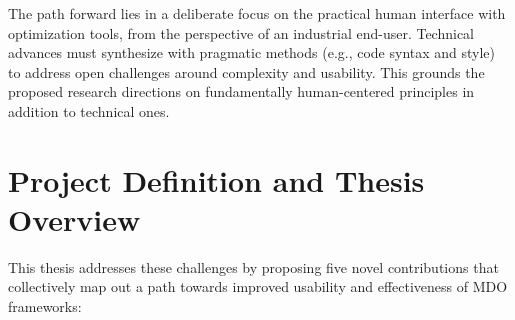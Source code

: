 The path forward lies in a deliberate focus on the practical human interface with optimization tools, from the perspective of an industrial end-user. Technical advances must synthesize with pragmatic methods (e.g., code syntax and style) to address open challenges around complexity and usability. This grounds the proposed research directions on fundamentally human-centered principles in addition to technical ones.

\section{Project Definition and Thesis Overview}
\label{sec:definition}

This thesis addresses these challenges by proposing five novel contributions that collectively map out a path towards improved usability and effectiveness of MDO frameworks:

